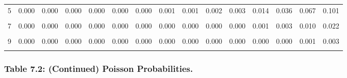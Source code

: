\documentclass[
]{article}
\begin{document}
\begin{table}[!h]
{\begin{tabular}[t]{ccccccccccccccc}
5 & 0.000 & 0.000 & 0.000 & 0.000 & 0.000 & 0.000 & 0.001 & 0.001 & 0.002 & 0.003 & 0.014 & 0.036 & 0.067 & 0.101\\
\cellcolor{gray!10}{6} & \cellcolor{gray!10}{0.000} & \cellcolor{gray!10}{0.000} & \cellcolor{gray!10}{0.000} & \cellcolor{gray!10}{0.000} & \cellcolor{gray!10}{0.000} & \cellcolor{gray!10}{0.000} & \cellcolor{gray!10}{0.000} & \cellcolor{gray!10}{0.000} & \cellcolor{gray!10}{0.000} & \cellcolor{gray!10}{0.001} & \cellcolor{gray!10}{0.004} & \cellcolor{gray!10}{0.012} & \cellcolor{gray!10}{0.028} & \cellcolor{gray!10}{0.050}\\
7 & 0.000 & 0.000 & 0.000 & 0.000 & 0.000 & 0.000 & 0.000 & 0.000 & 0.000 & 0.000 & 0.001 & 0.003 & 0.010 & 0.022\\
\cellcolor{gray!10}{8} & \cellcolor{gray!10}{0.000} & \cellcolor{gray!10}{0.000} & \cellcolor{gray!10}{0.000} & \cellcolor{gray!10}{0.000} & \cellcolor{gray!10}{0.000} & \cellcolor{gray!10}{0.000} & \cellcolor{gray!10}{0.000} & \cellcolor{gray!10}{0.000} & \cellcolor{gray!10}{0.000} & \cellcolor{gray!10}{0.000} & \cellcolor{gray!10}{0.000} & \cellcolor{gray!10}{0.001} & \cellcolor{gray!10}{0.003} & \cellcolor{gray!10}{0.008}\\
9 & 0.000 & 0.000 & 0.000 & 0.000 & 0.000 & 0.000 & 0.000 & 0.000 & 0.000 & 0.000 & 0.000 & 0.000 & 0.001 & 0.003\\
\addlinespace
\cellcolor{gray!10}{10} & \cellcolor{gray!10}{0.000} & \cellcolor{gray!10}{0.000} & \cellcolor{gray!10}{0.000} & \cellcolor{gray!10}{0.000} & \cellcolor{gray!10}{0.000} & \cellcolor{gray!10}{0.000} & \cellcolor{gray!10}{0.000} & \cellcolor{gray!10}{0.000} & \cellcolor{gray!10}{0.000} & \cellcolor{gray!10}{0.000} & \cellcolor{gray!10}{0.000} & \cellcolor{gray!10}{0.000} & \cellcolor{gray!10}{0.000} & \cellcolor{gray!10}{0.001}\\
\bottomrule
\end{tabular}}
\end{table}

\newpage

\subsubsection{Table 7.2: (Continued) Poisson
Probabilities.}\label{table-7.2-continued-poisson-probabilities.}
\end{document}
